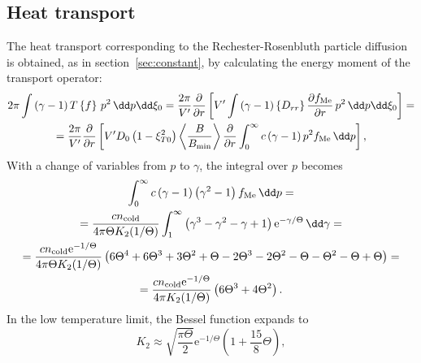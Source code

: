 \documentclass{notes}
\newcommand{\ee}{\mathrm{e}}
\newcommand{\fMe}{f_{\rm Me}}
\newcommand{\ncold}{n_{\rm cold}}
\begin{document}
    \subsection{Heat transport}
    The heat transport corresponding to the Rechester-Rosenbluth particle
    diffusion is obtained, as in section~\ref{sec:constant}, by calculating the
    energy moment of the transport operator:
    \begin{equation}
        \begin{gathered}
            2\pi\int\left(\gamma-1\right) T\left\{f\right\}\,p^2\,\dd p\dd\xi_0 =
                \frac{2\pi}{V'}\frac{\partial}{\partial r}\left[ V'
                    \int\left(\gamma-1\right)\left\{D_{rr}\right\} \frac{\partial\fMe}{\partial r}\,p^2\,\dd p\dd\xi_0
                \right] =\\
            = \frac{2\pi}{V'}\frac{\partial}{\partial r}\left[ V'D_0
                \left(1-\xi_{T0}^2\right)\left\langle\frac{B}{B_{\rm min}}\right\rangle
                \frac{\partial}{\partial r}\int_0^\infty c\left(\gamma-1\right)p^2\fMe\,\dd p
            \right],
        \end{gathered}
    \end{equation}
    With a change of variables from $p$ to $\gamma$, the integral over $p$
    becomes
    \begin{equation}
        \begin{gathered}
            \int_0^\infty c\left(\gamma-1\right)\left(\gamma^2-1\right)\fMe\,\dd p =\\
            = \frac{c\ncold}{4\pi\Theta K_2(1/\Theta)}\int_1^\infty\left(\gamma^3-\gamma^2-\gamma+1\right)\ee^{-\gamma/\Theta}\,\dd\gamma =\\
            = \frac{c\ncold\ee^{-1/\Theta}}{4\pi\Theta K_2(1/\Theta)}\left(
                6\Theta^4 + 6\Theta^3 + 3\Theta^2 + \Theta - 2\Theta^3 - 2\Theta^2 - \Theta -
                \Theta^2 - \Theta + \Theta
            \right) =\\
            = \frac{c\ncold\ee^{-1/\Theta}}{4\pi K_2(1/\Theta)}\left(
                6\Theta^3 + 4\Theta^2
            \right).
        \end{gathered}
    \end{equation}
    In the low temperature limit, the Bessel function expands to
    \begin{equation}
        K_2\approx \sqrt{\frac{\pi\Theta}{2}}\ee^{-1/\Theta}\left( 1 + \frac{15}{8}\Theta \right),
    \end{equation}
\end{document}
